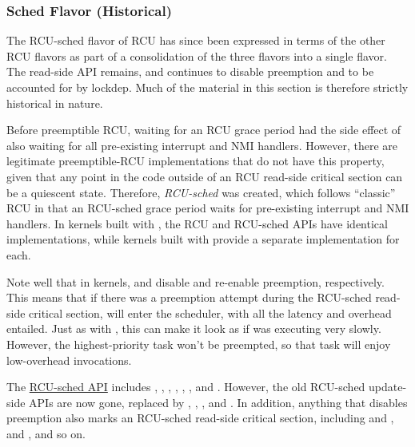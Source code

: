 \subsubsection{Sched Flavor (Historical)}

The RCU-sched flavor of RCU has since been expressed in terms of the
other RCU flavors as part of a consolidation of the three flavors into a
single flavor.
The read-side API remains, and continues to disable
preemption and to be accounted for by lockdep.
Much of the material in
this section is therefore strictly historical in nature.

Before preemptible RCU, waiting for an RCU grace period had the side
effect of also waiting for all pre-existing interrupt and NMI handlers.
However, there are legitimate preemptible-RCU implementations that do
not have this property, given that any point in the code outside of an
RCU read-side critical section can be a quiescent state.
Therefore,
\emph{RCU-sched} was created, which follows ``classic'' RCU in that an
RCU-sched grace period waits for pre-existing interrupt and NMI
handlers.
In kernels built with , the RCU and
RCU-sched APIs have identical implementations, while kernels built with
 provide a separate implementation for each.

Note well that in  kernels,
 and  disable and
re-enable preemption, respectively.
This means that if there was a
preemption attempt during the RCU-sched read-side critical section,
 will enter the scheduler, with all the
latency and overhead entailed.
Just as with ,
this can make it look as if  was executing
very slowly. However, the highest-priority task won't be preempted, so
that task will enjoy low-overhead 
invocations.

The \href{https://lwn.net/Articles/609973/#RCU%20Per-Flavor%20API%20Table}{RCU-sched API}
includes , ,
, ,
, , and
.
However, the old RCU-sched update-side APIs
are now gone, replaced by , ,
, and .
In addition, anything that disables
preemption also marks an RCU-sched read-side critical section,
including  and , 
and , and so on.


